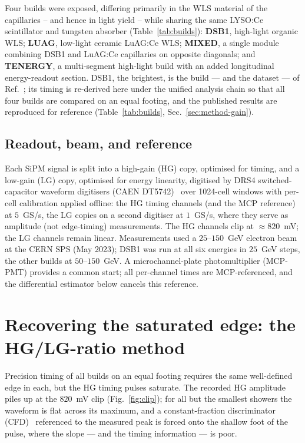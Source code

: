 \documentclass[final,5p,times,twocolumn]{elsarticle}
\begin{document}
Four builds were exposed, differing primarily in the WLS material of the capillaries --
and hence in light yield -- while sharing the same LYSO:Ce scintillator and tungsten
absorber (Table~\ref{tab:builds}): \textbf{DSB1}, high-light organic WLS;
\textbf{LUAG}, low-light ceramic LuAG:Ce WLS; \textbf{MIXED}, a single module combining
DSB1 and LuAG:Ce capillaries on opposite diagonals; and \textbf{TENERGY}, a
multi-segment high-light build with an added longitudinal energy-readout section. DSB1,
the brightest, is the build --- and the dataset --- of Ref.~\cite{radical}; its timing
is re-derived here under the unified analysis chain so that all four builds are compared
on an equal footing, and the published results are reproduced for reference
(Table~\ref{tab:builds}, Sec.~\ref{sec:method-gain}).

\subsection{Readout, beam, and reference}
Each SiPM signal is split into a high-gain (HG) copy, optimised for timing, and a
low-gain (LG) copy, optimised for energy linearity, digitised by DRS4
switched-capacitor waveform digitisers (CAEN DT5742)~\cite{drs4,ritt2014} over
1024-cell windows with per-cell calibration applied offline: the HG timing channels
(and the MCP reference) at $5$~GS/s, the LG copies on a second digitiser at $1$~GS/s,
where they serve as amplitude (not edge-timing) measurements. The HG channels clip at
$\approx\!820$~mV; the LG channels remain linear. Measurements used a $25$--$150$~GeV
electron beam at the CERN SPS (May 2023); DSB1 was run at all six energies in $25$~GeV
steps, the other builds at $50$--$150$~GeV. A microchannel-plate photomultiplier
(MCP-PMT) provides a common start; all per-channel times are MCP-referenced, and the
differential estimator below cancels this reference.

\section{Recovering the saturated edge: the HG/LG-ratio method}
\label{sec:method}

Precision timing of all builds on an equal footing requires the same well-defined edge
in each, but the HG timing pulses saturate. The recorded HG amplitude piles up at the
$820$~mV clip (Fig.~\ref{fig:clip}); for all but the smallest showers the waveform is
flat across its maximum, and a constant-fraction discriminator
(CFD)~\cite{gedcke1967,genat2009} referenced to the measured peak is forced onto the
shallow foot of the pulse, where the slope --- and the timing information --- is poor.
\end{document}
